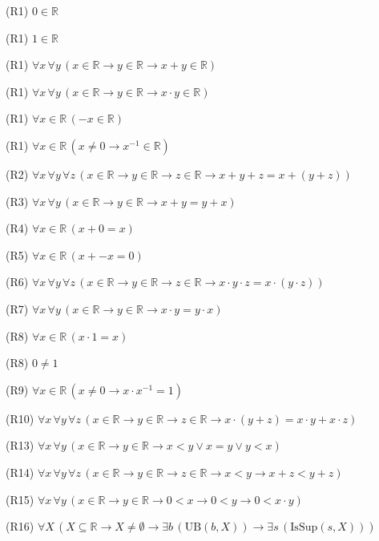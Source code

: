 \begin{registrylist}
\item[(R1)] $0 \in \mathbb{R}$
\item[(R1)] $1 \in \mathbb{R}$
\item[(R1)] $\forall x\,\forall y\,(x \in \mathbb{R} \to y \in \mathbb{R} \to x + y \in \mathbb{R})$
\item[(R1)] $\forall x\,\forall y\,(x \in \mathbb{R} \to y \in \mathbb{R} \to x \cdot y \in \mathbb{R})$
\item[(R1)] $\forall x \in \mathbb{R}\,(-x \in \mathbb{R})$
\item[(R1)] $\forall x \in \mathbb{R}\,(x \neq 0 \to x^{-1} \in \mathbb{R})$
\item[(R2)] $\forall x\,\forall y\,\forall z\,(x \in \mathbb{R} \to y \in \mathbb{R} \to z \in \mathbb{R} \to x + y + z = x + (y + z))$
\item[(R3)] $\forall x\,\forall y\,(x \in \mathbb{R} \to y \in \mathbb{R} \to x + y = y + x)$
\item[(R4)] $\forall x \in \mathbb{R}\,(x + 0 = x)$
\item[(R5)] $\forall x \in \mathbb{R}\,(x + -x = 0)$
\item[(R6)] $\forall x\,\forall y\,\forall z\,(x \in \mathbb{R} \to y \in \mathbb{R} \to z \in \mathbb{R} \to x \cdot y \cdot z = x \cdot (y \cdot z))$
\item[(R7)] $\forall x\,\forall y\,(x \in \mathbb{R} \to y \in \mathbb{R} \to x \cdot y = y \cdot x)$
\item[(R8)] $\forall x \in \mathbb{R}\,(x \cdot 1 = x)$
\item[(R8)] $0 \neq 1$
\item[(R9)] $\forall x \in \mathbb{R}\,(x \neq 0 \to x \cdot x^{-1} = 1)$
\item[(R10)] $\forall x\,\forall y\,\forall z\,(x \in \mathbb{R} \to y \in \mathbb{R} \to z \in \mathbb{R} \to x \cdot (y + z) = x \cdot y + x \cdot z)$
\item[(R13)] $\forall x\,\forall y\,(x \in \mathbb{R} \to y \in \mathbb{R} \to x < y \lor x = y \lor y < x)$
\item[(R14)] $\forall x\,\forall y\,\forall z\,(x \in \mathbb{R} \to y \in \mathbb{R} \to z \in \mathbb{R} \to x < y \to x + z < y + z)$
\item[(R15)] $\forall x\,\forall y\,(x \in \mathbb{R} \to y \in \mathbb{R} \to 0 < x \to 0 < y \to 0 < x \cdot y)$
\item[(R16)] $\forall X\,(X \subseteq \mathbb{R} \to X \neq \emptyset \to \exists b\,(\mathrm{UB}(b,X)) \to \exists s\,(\mathrm{IsSup}(s,X)))$

\end{registrylist}
